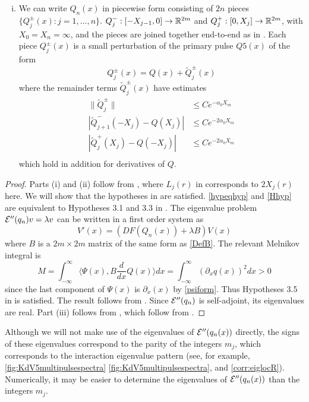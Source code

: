 \documentclass[thesis.tex]{subfiles}
\begin{document}
\begin{theorem}
\begin{enumerate}[(i)]
\item We can write $Q_n(x)$ in piecewise form consisting of $2n$ pieces $\{ Q_j^\pm(x) : j = 1, \dots, n \}$. $Q_j^-: [-X_{j-1}, 0] \rightarrow \mathbb{R}^{2m}$ and $Q_j^+: [0, X_j] \rightarrow \mathbb{R}^{2m}$, with $X_0 = X_n = \infty$, and the pieces are joined together end-to-end as in \cite{Sandstede1998}. Each piece $Q_j^\pm(x)$ is a small perturbation of the primary pulse $Q5(x)$ of the form
\begin{equation}\label{Qpmexpansions}
Q_j^\pm(x) = Q(x) + \tilde{Q}_j^\pm(x)
\end{equation}
where the remainder terms $\tilde{Q}_j^\pm(x)$ have estimates
\begin{equation}\label{Qpmestimates}
\begin{aligned}
\|\tilde{Q}_j^\pm\| &\leq C e^{-\alpha_0 X_m} \\
|\tilde{Q}_{j+1}^-(-X_j) - Q(X_j)| &\leq C e^{-2 \alpha_0 X_m} \\
|\tilde{Q}_j^+(X_j) - Q(-X_j)| &\leq C e^{-2 \alpha_0 X_m} \\
\end{aligned}
\end{equation}
which hold in addition for derivatives of $Q$.
\end{enumerate}
\begin{proof}
Parts (i) and (ii) follow from \cite{SandstedeStrut}, where $L_j(r)$ in \cite{SandstedeStrut} corresponds to $2X_j(r)$ here. We will show that the hypotheses in \cite{SandstedeStrut} are satisfied. \cref{hypeqhyp} and \cref{Hhyp} are equivalent to Hypotheses 3.1 and 3.3 in \cite{SandstedeStrut}. The eigenvalue problem $\mathcal{E}''(q_n)v = \lambda v$ can be written in a first order system as
\[
V'(x) = (DF(Q_n(x)) + \lambda B )V(x)
\]
where $B$ is a $2m\times 2m$ matrix of the same form as \cref{DefB}. The relevant Melnikov integral is
\[
M = \int_{-\infty}^\infty \langle \Psi(x), B \frac{d}{dx} Q(x) \rangle  dx = \int_{-\infty}^\infty (\partial_x q(x))^2 dx > 0
\]
since the last component of $\Psi(x)$ is $\partial_x (x)$ by \cref{psiform}. Thus Hypotheses 3.5 in \cite{SandstedeStrut} is satisfied. The result follows from \cite[Theorem 3.6]{SandstedeStrut}. Since $\mathcal{E}''(q_n)$ is self-adjoint, its eigenvalues are real. Part (iii) follows from \cite[Theorem 2]{Sandstede1998}, which follow from \cite{Sandstede1993}.
\end{proof}
\end{theorem}

\begin{remark}
Although we will not make use of the eigenvalues of $\mathcal{E}''(q_n(x))$ directly, the signs of these eigenvalues correspond to the parity of the integers $m_j$, which corresponds to the interaction eigenvalue pattern (see, for example, \cref{fig:KdV5multipulsespectra} \cref{fig:KdV5multipulsespectra}, and \cref{corr:eiglocR}). Numerically, it may be easier to determine the eigenvalues of $\mathcal{E}''(q_n(x))$ than the integers $m_j$. 
\end{remark}
\end{document}
